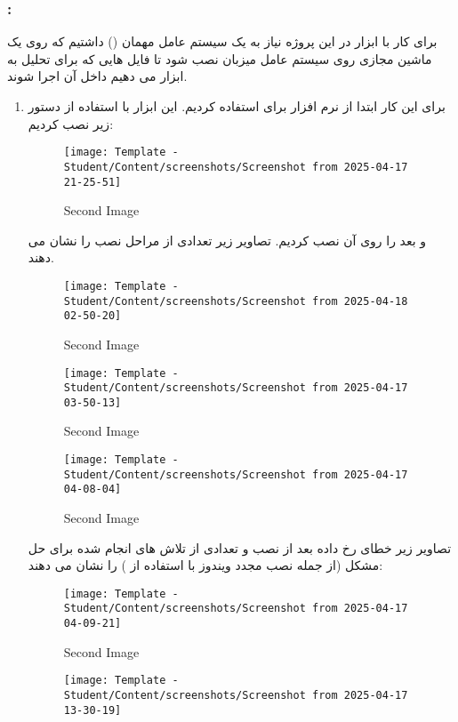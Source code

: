 \subsubsection*{:}
برای کار با ابزار  در این پروژه نیاز به یک سیستم عامل مهمان () داشتیم که روی یک ماشین مجازی روی سیستم عامل میزبان نصب شود تا فایل هایی که برای تحلیل به ابزار می دهیم داخل آن اجرا شوند.
\begin{enumerate}
    \item برای این کار ابتدا از نرم افزار  برای  استفاده کردیم. این ابزار با استفاده از دستور زیر نصب کردیم:
    \begin{figure}[htbp]
      \centering
      \texttt{[image: Template - Student/Content/screenshots/Screenshot from 2025-04-17 21-25-51]}
      \caption{Second Image}
      \label{fig:vert2}
    \end{figure}
    و بعد  را روی آن نصب کردیم. تصاویر زیر تعدادی از مراحل نصب را نشان می دهند.
    \begin{figure}[htbp]
      \centering
      \texttt{[image: Template - Student/Content/screenshots/Screenshot from 2025-04-18 02-50-20]}
      \caption{Second Image}
      \label{fig:vert2}
    \end{figure}
    \begin{figure}[htbp]
      \centering
      \texttt{[image: Template - Student/Content/screenshots/Screenshot from 2025-04-17 03-50-13]}
      \caption{Second Image}
      \label{fig:vert2}
    \end{figure}
    \begin{figure}[htbp]
      \centering
      \texttt{[image: Template - Student/Content/screenshots/Screenshot from 2025-04-17 04-08-04]}
      \caption{Second Image}
      \label{fig:vert2}
    \end{figure}
    تصاویر زیر خطای رخ داده بعد از نصب  و تعدادی از تلاش های انجام شده برای حل مشکل (از جمله نصب مجدد ویندوز با استفاده از ) را نشان می دهند:
    \begin{figure}[htbp]
      \centering
      \texttt{[image: Template - Student/Content/screenshots/Screenshot from 2025-04-17 04-09-21]}
      \caption{Second Image}
      \label{fig:vert2}
    \end{figure}
    \begin{figure}[htbp]
      \centering
      \texttt{[image: Template - Student/Content/screenshots/Screenshot from 2025-04-17 13-30-19]}

\end{figure}
\end{enumerate}

